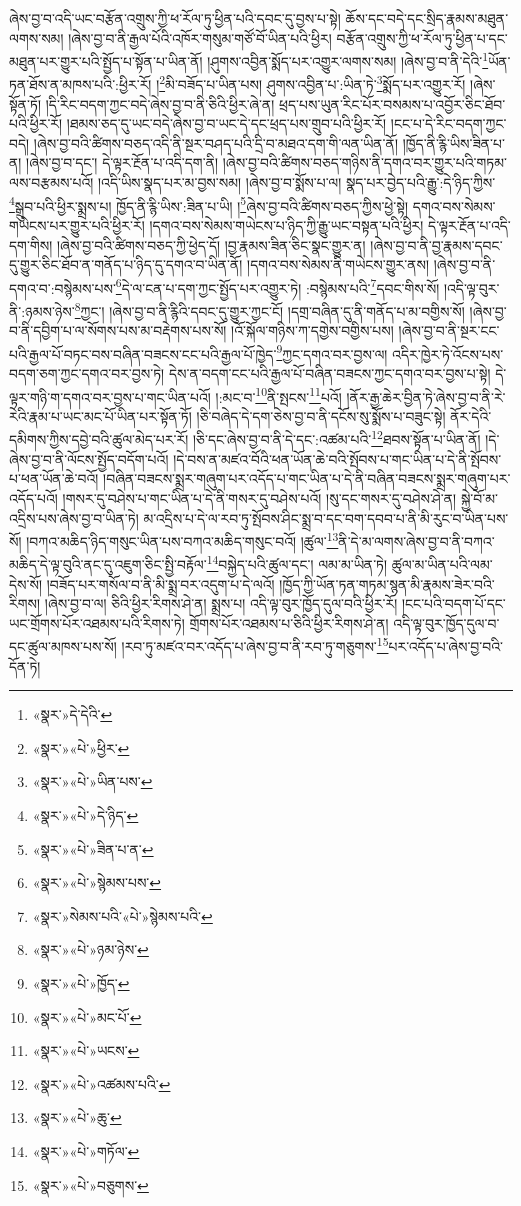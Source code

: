 ཞེས་བྱ་བ་འདི་ཡང་བརྩོན་འགྲུས་ཀྱི་ཕ་རོལ་ཏུ་ཕྱིན་པའི་དབང་དུ་བྱས་པ་སྟེ། ཆོས་དང་བདེ་དང་སྲིད་རྣམས་མཐུན་ལགས་སམ། །ཞེས་བྱ་བ་ནི་རྒྱལ་པོའི་འཁོར་གསུམ་གཙོ་བོ་ཡིན་པའི་ཕྱིར། བརྩོན་འགྲུས་ཀྱི་ཕ་རོལ་ཏུ་ཕྱིན་པ་དང་མཐུན་པར་གྱུར་པའི་སྤྱོད་པ་སྟོན་པ་ཡིན་ནོ། །ཤུགས་འབྱིན་སྨོད་པར་འགྱུར་ལགས་སམ། །ཞེས་བྱ་བ་ནི་དེའི་\footnote{«སྣར་»དེ་དེའི་}ཡོན་ཏན་ཐོས་ན་མཁས་པའི་:ཕྱིར་རོ། །\footnote{«སྣར་»«པེ་»ཕྱིར་}མི་བཟོད་པ་ཡིན་པས། ཤུགས་འབྱིན་པ་:ཡིན་ཏེ་\footnote{«སྣར་»«པེ་»ཡིན་པས་}སྨོད་པར་འགྱུར་རོ། །ཞེས་སྟོན་ཏོ། །དི་རིང་བདག་ཀྱང་བདེ་ཞེས་བྱ་བ་ནི་ཅིའི་ཕྱིར་ཞེ་ན། ཕྲད་པས་ཡུན་རིང་པོར་བསམས་པ་འབྱོར་ཅིང་ཐོབ་པའི་ཕྱིར་རོ། །ཐམས་ཅད་དུ་ཡང་བདེ་ཞེས་བྱ་བ་ཡང་དེ་དང་ཕྲད་པས་གྲུབ་པའི་ཕྱིར་རོ། །ངང་པ་དེ་རིང་བདག་ཀྱང་བདེ། །ཞེས་བྱ་བའི་ཚིགས་བཅད་འདི་ནི་སྔར་བཤད་པའི་དྲི་བ་མཐའ་དག་གི་ལན་ཡིན་ནོ། །ཁྱོད་ནི་རྙི་ཡིས་ཟིན་པ་ན། །ཞེས་བྱ་བ་དང་། དེ་ལྟར་རྔོན་པ་འདི་དག་ནི། །ཞེས་བྱ་བའི་ཚིགས་བཅད་གཉིས་ནི་དགའ་བར་གྱུར་པའི་གཏམ་ལས་བརྩམས་པའོ། །འདི་ཡིས་སྣད་པར་མ་བྱས་སམ། །ཞེས་བྱ་བ་སྨོས་པ་ལ། སྣད་པར་བྱེད་པའི་རྒྱུ་:དེ་ཉིད་ཀྱིས་\footnote{«སྣར་»«པེ་»དེ་ཉིད་}སྒྲུབ་པའི་ཕྱིར་སྨྲས་པ། ཁྱོད་ནི་རྙི་ཡིས་:ཟིན་པ་ཡི། །\footnote{«སྣར་»«པེ་»ཟིན་པ་ན་}ཞེས་བྱ་བའི་ཚིགས་བཅད་ཀྱིས་ཕྱེ་སྟེ། དགའ་བས་སེམས་གཡེངས་པར་གྱུར་པའི་ཕྱིར་རོ། །དགའ་བས་སེམས་གཡེངས་པ་ཉིད་ཀྱི་རྒྱུ་ཡང་བསྟན་པའི་ཕྱིར། དེ་ལྟར་རྔོན་པ་འདི་དག་གིས། །ཞེས་བྱ་བའི་ཚིགས་བཅད་ཀྱི་ཕྱེད་དོ། །བྱ་རྣམས་ཟིན་ཅིང་སྣང་གྱུར་ན། །ཞེས་བྱ་བ་ནི་བྱ་རྣམས་དབང་དུ་གྱུར་ཅིང་ཐོབ་ན་གནོད་པ་ཉིད་དུ་དགའ་བ་ཡིན་ནོ། །དགའ་བས་སེམས་ནི་གཡེངས་གྱུར་ནས། །ཞེས་བྱ་བ་ནི་དགའ་བ་:བསྙེམས་པས་\footnote{«སྣར་»«པེ་»སྙེམས་པས་}དེ་ལ་ངན་པ་དག་ཀྱང་སྤྱོད་པར་འགྱུར་ཏེ། :བསྙེམས་པའི་\footnote{«སྣར་»སེམས་པའི་«པེ་»སྙེམས་པའི་}དབང་གིས་སོ། །འདི་ལྟ་བུར་ནི་:ཉམས་ཉེས་\footnote{«སྣར་»«པེ་»ཉམ་ཉེས་}ཀྱང་། །ཞེས་བྱ་བ་ནི་རྙིའི་དབང་དུ་གྱུར་ཀྱང་ངོ། །དགྲ་བཞིན་དུ་ནི་གནོད་པ་མ་བགྱིས་སོ། །ཞེས་བྱ་བ་ནི་དབྱིག་པ་ལ་སོགས་པས་མ་བརྡེགས་པས་སོ། །འོ་སྐོལ་གཉིས་ཀ་དགྱེས་བགྱིས་པས། །ཞེས་བྱ་བ་ནི་སྔར་ངང་པའི་རྒྱལ་པོ་བཏང་བས་བཞིན་བཟངས་ངང་པའི་རྒྱལ་པོ་ཁྱེད་\footnote{«སྣར་»«པེ་»ཁྱོད་}ཀྱང་དགའ་བར་བྱས་ལ། འདིར་ཁྱེར་ཏེ་འོངས་པས་བདག་ཅག་ཀྱང་དགའ་བར་བྱས་ཏེ། དེས་ན་བདག་ངང་པའི་རྒྱལ་པོ་བཞིན་བཟངས་ཀྱང་དགའ་བར་བྱས་པ་སྟེ། དེ་ལྟར་གཉི་ག་དགའ་བར་བྱས་པ་གང་ཡིན་པའོ། །:མང་བ་\footnote{«སྣར་»«པེ་»མང་པོ་}ནི་སྤངས་\footnote{«སྣར་»«པེ་»ཡངས་}པའོ། །ནོར་རྒྱ་ཆེར་བྱིན་ཏེ་ཞེས་བྱ་བ་ནི་རེ་རེའི་རྣམ་པ་ཡང་མང་པོ་ཡིན་པར་སྟོན་ཏོ། །ཅི་བཞེད་དེ་དག་ཅེས་བྱ་བ་ནི་དངོས་སུ་སྨོས་པ་བཟུང་སྟེ། ནོར་དེའི་དམིགས་ཀྱིས་དབྱེ་བའི་ཚུལ་མེད་པར་རོ། །ཅི་དང་ཞེས་བྱ་བ་ནི་དེ་དང་:འཚམ་པའི་\footnote{«སྣར་»«པེ་»འཚམས་པའི་}ཐབས་སྟོན་པ་ཡིན་ནོ། །དེ་ཞེས་བྱ་བ་ནི་ལོངས་སྤྱོད་བདོག་པའོ། །དེ་བས་ན་མཛའ་བོའི་ཕན་ཡོན་ཆེ་བའི་སྤོབས་པ་གང་ཡིན་པ་དེ་ནི་སྤོབས་པ་ཕན་ཡོན་ཆེ་བའོ། །བཞིན་བཟངས་སྨྲར་གཞུག་པར་འདོད་པ་གང་ཡིན་པ་དེ་ནི་བཞིན་བཟངས་སྨྲར་གཞུག་པར་འདོད་པའོ། །གསར་དུ་བཤེས་པ་གང་ཡིན་པ་དེ་ནི་གསར་དུ་བཤེས་པའོ། །སུ་དང་གསར་དུ་བཤེས་ཤེ་ན། སྐྱེ་བོ་མ་འདྲིས་པས་ཞེས་བྱ་བ་ཡིན་ཏེ། མ་འདྲིས་པ་དེ་ལ་རབ་ཏུ་སྤོབས་ཤིང་སྨྲ་བ་དང་བག་དབབ་པ་ནི་མི་རུང་བ་ཡིན་པས་སོ། །བཀའ་མཆིད་ཉིད་གསུང་ཡིན་པས་བཀའ་མཆིད་གསུང་བའོ། །ཚུལ་\footnote{«སྣར་»«པེ་»ཆུ་}ནི་དེ་མ་ལགས་ཞེས་བྱ་བ་ནི་བཀའ་མཆིད་དེ་ལྟ་བུའི་ནང་དུ་འཇུག་ཅིང་སྤྱི་བརྟོལ་\footnote{«སྣར་»«པེ་»གཏོལ་}བསྐྱེད་པའི་ཚུལ་དང་། ལམ་མ་ཡིན་ཏེ། ཚུལ་མ་ཡིན་པའི་ལམ་དེས་སོ། །བཟོད་པར་གསོལ་བ་ནི་མི་སྨྲ་བར་འདུག་པ་དེ་ལའོ། །ཁྱོད་ཀྱི་ཡོན་ཏན་གཏམ་སྙན་མི་རྣམས་ཟེར་བའི་རིགས། །ཞེས་བྱ་བ་ལ། ཅིའི་ཕྱིར་རིགས་ཤེ་ན། སྨྲས་པ། འདི་ལྟ་བུར་ཁྱོད་དུལ་བའི་ཕྱིར་རོ། །ངང་པའི་བདག་པོ་དང་ཡང་གྲོགས་པོར་འཐམས་པའི་རིགས་ཏེ། གྲོགས་པོར་འཐམས་པ་ཅིའི་ཕྱིར་རིགས་ཤེ་ན། འདི་ལྟ་བུར་ཁྱོད་དུལ་བ་དང་ཚུལ་མཁས་པས་སོ། །རབ་ཏུ་མཛའ་བར་འདོད་པ་ཞེས་བྱ་བ་ནི་རབ་ཏུ་གཅུགས་\footnote{«སྣར་»«པེ་»བཅུགས་}པར་འདོད་པ་ཞེས་བྱ་བའི་དོན་ཏེ། 